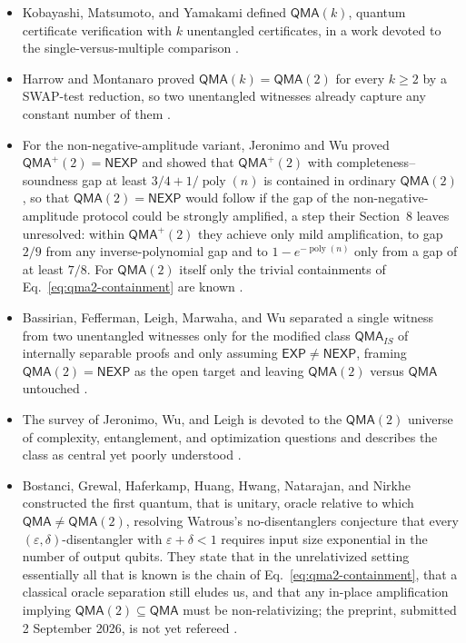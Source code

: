 \begin{itemize}
  \item Kobayashi, Matsumoto, and Yamakami defined $\mathsf{QMA}(k)$, quantum
  certificate verification with $k$ unentangled certificates, in a work
  devoted to the single-versus-multiple comparison
  .

  \item Harrow and Montanaro proved $\mathsf{QMA}(k) = \mathsf{QMA}(2)$ for every
  $k \ge 2$ by a SWAP-test reduction, so two unentangled witnesses already
  capture any constant number of them .

  \item For the non-negative-amplitude variant, Jeronimo and Wu proved
  $\mathsf{QMA}^{+}(2) = \mathsf{NEXP}$ and showed that
  $\mathsf{QMA}^{+}(2)$ with completeness--soundness gap at least
  $3/4 + 1/\operatorname{poly}(n)$ is contained in ordinary
  $\mathsf{QMA}(2)$, so that $\mathsf{QMA}(2) = \mathsf{NEXP}$ would follow
  if the gap of the non-negative-amplitude protocol could be strongly
  amplified, a step their Section~8 leaves unresolved: within
  $\mathsf{QMA}^{+}(2)$ they achieve only mild amplification, to gap $2/9$
  from any inverse-polynomial gap and to $1 - e^{-\operatorname{poly}(n)}$
  only from a gap of at least $7/8$.  For $\mathsf{QMA}(2)$ itself only the
  trivial containments of Eq.~\eqref{eq:qma2-containment} are known
  .

  \item Bassirian, Fefferman, Leigh, Marwaha, and Wu separated a single witness
  from two unentangled witnesses only for the modified class
  $\mathsf{QMA}_{IS}$ of internally separable proofs and only assuming
  $\mathsf{EXP} \ne \mathsf{NEXP}$, framing $\mathsf{QMA}(2) = \mathsf{NEXP}$ as
  the open target and leaving $\mathsf{QMA}(2)$ versus $\mathsf{QMA}$
  untouched .

  \item The survey of Jeronimo, Wu, and Leigh is devoted to the
  $\mathsf{QMA}(2)$ universe of complexity, entanglement, and optimization
  questions and describes the class as central yet poorly understood
  .

  \item Bostanci, Grewal, Haferkamp, Huang, Hwang, Natarajan, and Nirkhe
  constructed the first quantum, that is unitary, oracle relative to which
  $\mathsf{QMA} \ne \mathsf{QMA}(2)$, resolving Watrous's no-disentanglers
  conjecture that every $(\varepsilon, \delta)$-disentangler with
  $\varepsilon + \delta < 1$ requires input size exponential in the number of output qubits.  They
  state that in the unrelativized setting essentially all that is known is
  the chain of Eq.~\eqref{eq:qma2-containment}, that a classical oracle
  separation still eludes us, and that any in-place amplification implying
  $\mathsf{QMA}(2) \subseteq \mathsf{QMA}$ must be non-relativizing; the
  preprint, submitted 2 September 2026, is not yet refereed
  .
\end{itemize}

